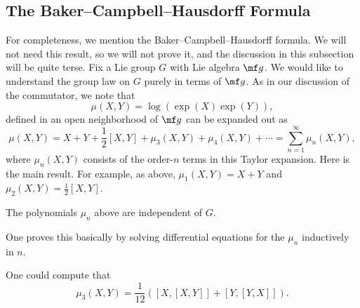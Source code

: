 \documentclass[../notes.tex]{subfiles}
\begin{document}
\subsection{The Baker--Campbell--Hausdorff Formula}
For completeness, we mention the Baker--Campbell--Hausdorff formula. We will not need this result, so we will not prove it, and the discussion in this subsection will be quite terse. Fix a Lie group $G$ with Lie algebra $\mf g$. We would like to understand the group law on $G$ purely in terms of $\mf g$. As in our discussion of the commutator, we note that
\[\mu(X,Y)=\log(\exp(X)\exp(Y)),\]
defined in an open neighborhood of $\mf g$ can be expanded out as
\[\mu(X,Y)=X+Y+\frac12[X,Y]+\mu_3(X,Y)+\mu_4(X,Y)+\cdots=\sum_{n=1}^\infty\mu_n(X,Y),\]
where $\mu_n(X,Y)$ consists of the order-$n$ terms in this Taylor expansion. Here is the main result. For example, as above, $\mu_1(X,Y)=X+Y$ and $\mu_2(X,Y)=\frac12[X,Y]$.
\begin{theorem}
	The polynomials $\mu_n$ above are independent of $G$.
\end{theorem}
One proves this basically by solving differential equations for the $\mu_n$ inductively in $n$.
\begin{example}
	One could compute that
	\[\mu_3(X,Y)=\frac1{12}([X,[X,Y]]+[Y,[Y,X]]).\]
\end{example}
\end{document}
